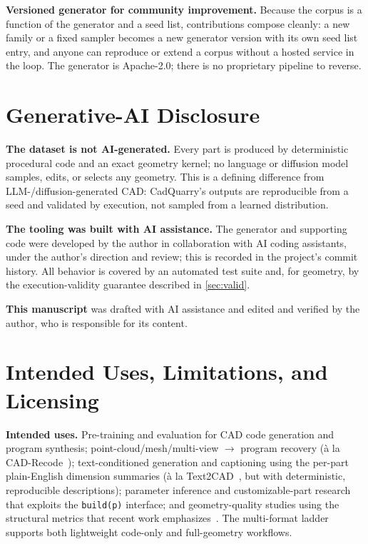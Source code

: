 \documentclass[11pt]{article}
\newcommand{\code}[1]{\texttt{#1}}
\newcommand{\apache}{Apache-2.0}
\begin{document}
\textbf{Versioned generator for community improvement.} Because the corpus is a
function of the generator and a seed list, contributions compose cleanly: a new
family or a fixed sampler becomes a new generator version with its own seed list
entry, and anyone can reproduce or extend a corpus without a hosted service in the
loop. The generator is \apache{}; there is no proprietary pipeline to reverse.

\section{Generative-AI Disclosure}\label{sec:ai}
\begin{warnbox}
\textbf{The dataset is not AI-generated.} Every part is produced by deterministic
procedural code and an exact geometry kernel; no language or diffusion model
samples, edits, or selects any geometry. This is a defining difference from
LLM-/diffusion-generated CAD: CadQuarry's outputs are reproducible from a seed and
validated by execution, not sampled from a learned distribution.

\smallskip
\textbf{The tooling was built with AI assistance.} The generator and supporting
code were developed by the author in collaboration with AI coding
assistants, under the author's direction and review; this is recorded in the
project's commit history. All
behavior is covered by an automated test suite and, for geometry, by the
execution-validity guarantee described in \cref{sec:valid}.

\smallskip
\textbf{This manuscript} was drafted with AI assistance and edited and verified by
the author, who is responsible for its content.
\end{warnbox}

\section{Intended Uses, Limitations, and Licensing}\label{sec:uses}
\textbf{Intended uses.} Pre-training and evaluation for CAD code generation and
program synthesis; point-cloud/mesh/multi-view $\rightarrow$ program recovery
(à la CAD-Recode~\cite{cadrecode}); text-conditioned generation and captioning
using the per-part plain-English dimension summaries (à
la Text2CAD~\cite{text2cad}, but with deterministic, reproducible descriptions);
parameter inference and customizable-part research that exploits the
\code{build(p)} interface; and geometry-quality studies using the structural
metrics that recent work emphasizes~\cite{cadmium}.
The multi-format ladder supports both lightweight code-only and full-geometry
workflows.
\end{document}
